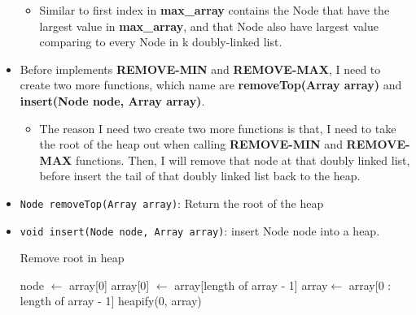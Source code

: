 \documentclass{article}
\begin{document}
\begin{itemize}
\begin{itemize}
			\item Similar to first index in \textbf{max\_array} contains the Node that have the largest value in \textbf{max\_array}, and that Node also have largest value comparing to every Node in k doubly-linked list.
		\end{itemize}
		\item Before implements \textbf{REMOVE-MIN} and \textbf{REMOVE-MAX}, I need to create two more functions, which name are \textbf{removeTop(Array array)} and \textbf{insert(Node node, Array array)}.
		\begin{itemize}
			\item The reason I need two create two more functions is that, I need to take the root of the heap out when calling \textbf{REMOVE-MIN} and \textbf{REMOVE-MAX} functions. Then, I will remove that node at that doubly linked list, before insert the tail of that doubly linked list back to the heap. 
		\end{itemize}
		\item \verb|Node removeTop(Array array)|: Return the root of the heap
		\item \verb|void insert(Node node, Array array)|: insert Node node into a heap.
		
		\begin{algorithm}[H]
			\caption{Remove root in heap}
		\begin{algorithmic}[1]
			\State node \(\gets\) array[0] 
			\State array[0] \(\gets\) array[length of array - 1] 
			\State array\(\gets\) array[0 : length of array - 1] 
			\State heapify(0, array) 
			\State {}
			\EndFunction{}
		\end{algorithmic}
		\end{algorithm}



\end{itemize}
\end{document}
